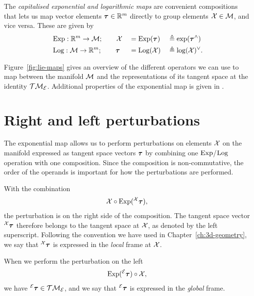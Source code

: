 The \emph{capitalised exponential and logarithmic maps} are convenient compositions that lets us map vector elements ${\boldsymbol{\mathbf{\tau}}} \in {\mathbb R}^m$ directly to group elements $\mathcal{X} \in \mathcal{M}$, and vice versa.
These are given by
\begin{alignat}{3}
  &\operatorname*{Exp}: {\mathbb R}^m \to \mathcal{M}; \quad\quad \mathcal{X} &&= \operatorname*{Exp}({\boldsymbol{\mathbf{\tau}}}) &&\triangleq \exp({\boldsymbol{\mathbf{\tau}}}^\wedge)\\
  &\operatorname*{Log}: \mathcal{M} \to {\mathbb R}^m; \quad\quad {\boldsymbol{\mathbf{\tau}}} &&= \operatorname*{Log}(\mathcal{X}) &&\triangleq \log(\mathcal{X})^\vee.
\end{alignat}

Figure~\ref{fig:lie-maps} gives an overview of the different operators we can use to map between the manifold $\mathcal{M}$ and the representations of its tangent space at the identity $\mathcal{T}\mathcal{M}_{\mathcal{E}}$.
Additional properties of the exponential map is given in \cite{SolaARobotics, barfoot2017state}.

\section{Right and left perturbations} \label{sec:lie-right-left-perturbations}
The exponential map allows us to perform perturbations on elements $\mathcal{X}$ on the manifold expressed as tangent space vectors ${\boldsymbol{\mathbf{\tau}}}$ by combining one $\operatorname*{Exp}$/$\operatorname*{Log}$ operation with one composition.
Since the composition is non-commutative, the order of the operands is important for how the perturbations are performed.

With the combination
\begin{equation}
  \mathcal{X} \circ \operatorname*{Exp}(\prescript{\mathcal{X}}{}{{\boldsymbol{\mathbf{\tau}}}}),
\end{equation}
the perturbation is on the right side of the composition.
The tangent space vector $\prescript{\mathcal{X}}{}{{\boldsymbol{\mathbf{\tau}}}}$ therefore belongs to the tangent space at $\mathcal{X}$, as denoted by the left superscript.
Following the convention we have used in Chapter~\ref{ch:3d-geometry}, we say that $\prescript{\mathcal{X}}{}{{\boldsymbol{\mathbf{\tau}}}}$ is expressed in the \emph{local} frame at $\mathcal{X}$.

When we perform the perturbation on the left
\begin{equation}
 \operatorname*{Exp}(\prescript{\mathcal{E}}{}{{\boldsymbol{\mathbf{\tau}}}}) \circ \mathcal{X},
\end{equation}
we have $\prescript{\mathcal{E}}{}{{\boldsymbol{\mathbf{\tau}}}} \in \mathcal{T}\mathcal{M}_{\mathcal{E}}$, and we say that $\prescript{\mathcal{E}}{}{{\boldsymbol{\mathbf{\tau}}}}$ is expressed in the \emph{global} frame.

